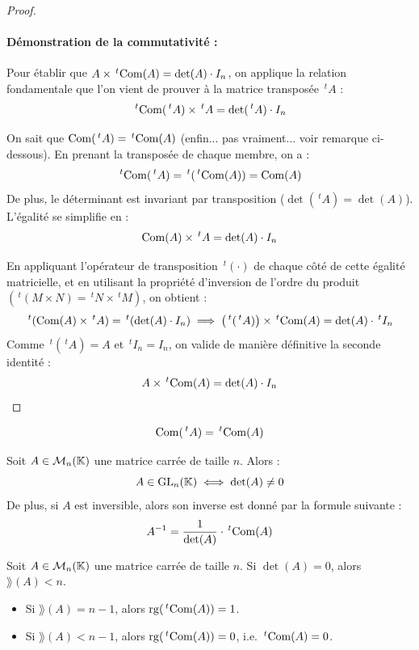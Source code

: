 \documentclass[12pt, a4paper]{report}
\begin{document}
\begin{proof}
    \paragraph{Démonstration de la commutativité :}
    Pour établir que $A \times \,^t\mathrm{Com}(A) = \det(A) \cdot I_n$, on applique la relation fondamentale que l'on vient de prouver à la matrice transposée $\,^tA$ :
    $$\,^t\mathrm{Com}(\,^tA) \times \,^tA = \det(\,^tA) \cdot I_n$$
    
    On sait que $\mathrm{Com}(\,^tA) = \,^t\mathrm{Com}(A)$ (enfin... pas vraiment... voir remarque ci-dessous). En prenant la transposée de chaque membre, on a :
    $$\,^t\mathrm{Com}(\,^tA) = \,^t(\,^t\mathrm{Com}(A)) = \mathrm{Com}(A)$$
    De plus, le déterminant est invariant par transposition ($\det(\,^tA) = \det(A)$). L'égalité se simplifie en :
    $$\mathrm{Com}(A) \times \,^tA = \det(A) \cdot I_n$$
    
    En appliquant l'opérateur de transposition $\,^t(\cdot)$ de chaque côté de cette égalité matricielle, et en utilisant la propriété d'inversion de l'ordre du produit $(\,^t(M \times N) = \,^tN \times \,^tM)$, on obtient :
    $$\,^t(\mathrm{Com}(A) \times \,^tA) = \,^t(\det(A) \cdot I_n) \implies \bigl(\,^t(\,^tA)\bigr) \times \,^t\mathrm{Com}(A) = \det(A) \cdot \,^tI_n$$
    Comme $\,^t(\,^tA) = A$ et $\,^tI_n = I_n$, on valide de manière définitive la seconde identité :
    $$A \times \,^t\mathrm{Com}(A) = \det(A) \cdot I_n$$
\end{proof}

\begin{remark}
    $$\mathrm{Com}(\,^tA) = \,^t\mathrm{Com}(A)$$
\end{remark}
\begin{consequence}
    Soit $A \in \mathcal M_n(\mathbb{K})$ une matrice carrée de taille $n$. Alors :
    $$A \in \mathrm{GL}_n(\mathbb{K}) \iff \det(A) \ne 0$$
    De plus, si $A$ est inversible, alors son inverse est donné par la formule suivante :
    $$A^{-1} = \frac{1}{\det(A)} \cdot \,^t\mathrm{Com}(A)$$
\end{consequence}

\begin{consequence}
    Soit $A \in \mathcal M_n(\mathbb{K})$ une matrice carrée de taille $n$. Si $\det(A) = 0$, alors $\rang(A) < n$.
    \begin{itemize}
        \item Si $\rang(A) = n-1$, alors $\mathrm{rg}(\,^t\mathrm{Com}(A)) = 1$.
        \item Si $\rang(A) < n-1$, alors $\mathrm{rg}(\,^t\mathrm{Com}(A)) = 0$, i.e. $\,^t\mathrm{Com}(A) = 0$.
    \end{itemize}
\end{consequence}
\end{document}
